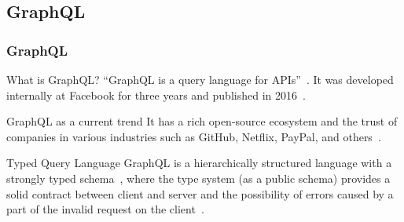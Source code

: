 \subsection{GraphQL}

\begin{frame}\frametitle{GraphQL}

  \begin{block}{What is GraphQL?}
    \enquote{GraphQL is a query language for APIs}~\cite{gql-spec}. It was developed internally at  Facebook for three years and published in 2016~\cite{initial-analysis-of-gql}. 
  \end{block}

  \begin{block}{GraphQL as a current trend}
    It has a rich open-source ecosystem and the trust of companies in various industries such as GitHub, Netflix, PayPal, and others~\cite{morph-gql-1,gql-healthcare}.
  \end{block}

\begin{block}{Typed Query Language}
  GraphQL is a hierarchically structured language with a strongly typed schema~\cite{gql-healthcare}, where the type system (as a public schema) provides a solid contract between client and server and the possibility of errors caused by a part of the invalid request on the client~\cite{real-time-sys-arc-based-on-gql}.
\end{block}

\end{frame}

